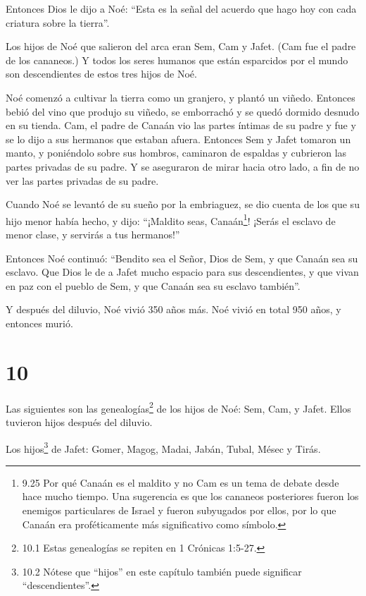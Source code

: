 Entonces Dios le dijo a Noé: ``Esta es la señal del
acuerdo que hago hoy con cada criatura sobre la tierra''.

 Los hijos de Noé que salieron del arca eran Sem, Cam y
Jafet. (Cam fue el padre de los cananeos.)  Y todos los
seres humanos que están esparcidos por el mundo son descendientes de
estos tres hijos de Noé.

 Noé comenzó a cultivar la tierra como un granjero, y
plantó un viñedo.  Entonces bebió del vino que produjo su
viñedo, se emborrachó y se quedó dormido desnudo en su tienda.
 Cam, el padre de Canaán vio las partes íntimas de su padre
y fue y se lo dijo a sus hermanos que estaban afuera. 
Entonces Sem y Jafet tomaron un manto, y poniéndolo sobre sus hombros,
caminaron de espaldas y cubrieron las partes privadas de su padre. Y se
aseguraron de mirar hacia otro lado, a fin de no ver las partes privadas
de su padre.

 Cuando Noé se levantó de su sueño por la embriaguez, se
dio cuenta de los que su hijo menor había hecho,  y dijo:
``¡Maldito seas, Canaán\footnote{9.25 Por qué Canaán es el maldito y no
  Cam es un tema de debate desde hace mucho tiempo. Una sugerencia es
  que los cananeos posteriores fueron los enemigos particulares de
  Israel y fueron subyugados por ellos, por lo que Canaán era
  proféticamente más significativo como símbolo.}! ¡Serás el esclavo de
menor clase, y servirás a tus hermanos!''

 Entonces Noé continuó: ``Bendito sea el Señor, Dios de
Sem, y que Canaán sea su esclavo.  Que Dios le de a Jafet
mucho espacio para sus descendientes, y que vivan en paz con el pueblo
de Sem, y que Canaán sea su esclavo también''.

 Y después del diluvio, Noé vivió 350 años más.
 Noé vivió en total 950 años, y entonces murió.

\hypertarget{section-9}{%
\section{10}\label{section-9}}

 Las siguientes son las genealogías\footnote{10.1 Estas
  genealogías se repiten en 1 Crónicas 1:5-27.} de los hijos de Noé:
Sem, Cam, y Jafet. Ellos tuvieron hijos después del diluvio.

 Los hijos\footnote{10.2 Nótese que ``hijos'' en este
  capítulo también puede significar ``descendientes''.} de Jafet: Gomer,
Magog, Madai, Jabán, Tubal, Mésec y Tirás.


